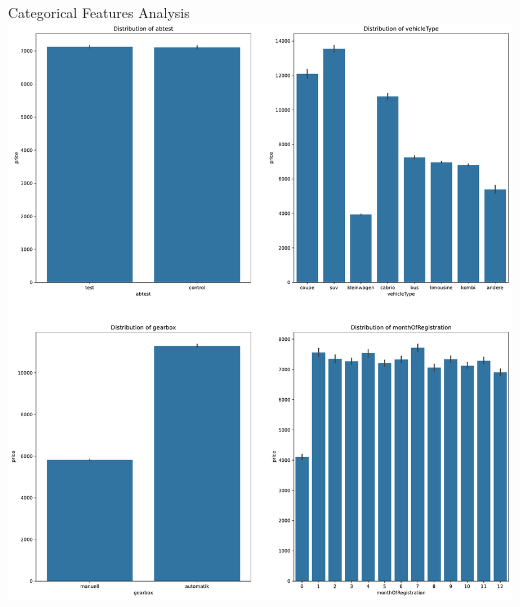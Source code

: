 \documentclass{beamer}
\begin{document}
\begin{frame}{Categorical Features Analysis}
        \center
        \includegraphics[scale=0.2]{cat_features_barplot1.pdf}
\end{frame}
\end{document}
